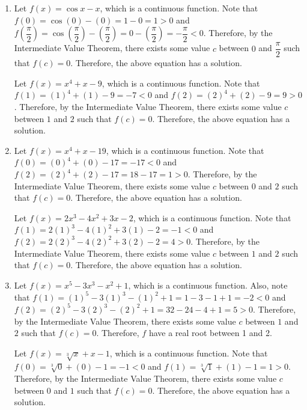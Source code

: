 \documentclass{book}
\begin{document}
\begin{appendices}
\begin{enumerate}[!HW!]
\item 
\begin{pf}
Let $f(x) = \cos x - x$, which is a continuous function. Note that $f(0) = \cos(0) - (0) = 1-0 = 1 > 0$ and $f\left(\dfrac{\pi}{2}\right) = \cos\left(\dfrac{\pi}{2}\right) - \left(\dfrac{\pi}{2}\right) = 0 - \left(\dfrac{\pi}{2}\right) = -\dfrac{\pi}{2} < 0$. Therefore, by the Intermediate Value Theorem, there exists some value $c$ between $0$ and $\dfrac{\pi}{2}$ such that $f(c) = 0$. Therefore, the above equation has a solution.
\end{pf}
\itemspade 
\begin{pf}
Let $f(x) = x^4+x-9$, which is a continuous function. Note that $f(1) = (1)^4+(1)-9 = -7 < 0$ and $f(2) = (2)^4+(2)-9 = 9 > 0$. Therefore, by the Intermediate Value Theorem, there exists some value $c$ between $1$ and $2$ such that $f(c) = 0$. Therefore, the above equation has a solution.
\end{pf}
\item 
\begin{pf}
Let $f(x) = x^4+x-19$, which is a continuous function. Note that $f(0) = (0)^4+(0)-17= -17 < 0$ and $f\left(2\right) = (2)^4+(2) -17 = 18-17 = 1 > 0$. Therefore, by the Intermediate Value Theorem, there exists some value $c$ between $0$ and $2$ such that $f(c) = 0$. Therefore, the above equation has a solution.
\end{pf}
\itemspade 
\begin{pf}
Let $f(x) = 2x^3-4x^2+3x-2$, which is a continuous function. Note that $f(1) = 2(1)^3-4(1)^2+3(1)-2 = -1 < 0$ and $f(2) = 2(2)^3-4(2)^2+3(2)-2 = 4 > 0$. Therefore, by the Intermediate Value Theorem, there exists some value $c$ between $1$ and $2$ such that $f(c) = 0$. Therefore, the above equation has a solution.
\end{pf}
\item 
\begin{pf}
Let $f(x) = x^5-3x^3-x^2+1$, which is a continuous function.  Also, note that $f(1) = (1)^5-3(1)^3-(1)^2+1 = 1-3-1+1 = -2 < 0$ and $f\left(2\right) = (2)^5-3(2)^3-(2)^2+1 = 32-24-4+1= 5> 0$. Therefore, by the Intermediate Value Theorem, there exists some value $c$ between $1$ and $2$ such that $f(c) = 0$. Therefore, $f$ have a real root between 1 and 2.
\end{pf}
\itemspade 
\begin{pf}
Let $f(x) = \sqrt[3]{x}+x-1$, which is a continuous function. Note that $f(0) =\sqrt[3]{0} + (0) - 1 = -1 < 0$ and $f(1) = \sqrt[3]{1} + (1) - 1 = 1 > 0$. Therefore, by the Intermediate Value Theorem, there exists some value $c$ between $0$ and $1$ such that $f(c) = 0$. Therefore, the above equation has a solution.

\end{pf}
\end{enumerate}
\end{appendices}
\end{document}
